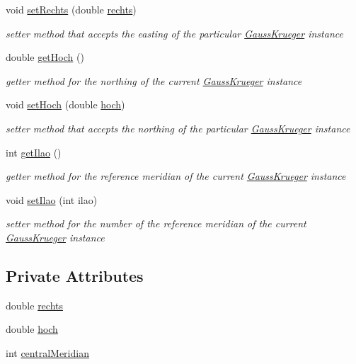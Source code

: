 \begin{DoxyCompactItemize}
void \hyperlink{classcoordinates_1_1_gauss_krueger_aae6034f16ac245dac1c1d84722048894}{set\+Rechts} (double \hyperlink{classcoordinates_1_1_gauss_krueger_a7b3a7878b5c0e9af6afee712997630b7}{rechts})
\begin{DoxyCompactList}\small\item\em setter method that accepts the easting of the particular \hyperlink{classcoordinates_1_1_gauss_krueger}{Gauss\+Krueger} instance \end{DoxyCompactList}\item 
double \hyperlink{classcoordinates_1_1_gauss_krueger_ac6dfe7a78850b5aa7c69e1e5d2a0b3cf}{get\+Hoch} ()
\begin{DoxyCompactList}\small\item\em getter method for the northing of the current \hyperlink{classcoordinates_1_1_gauss_krueger}{Gauss\+Krueger} instance \end{DoxyCompactList}\item 
void \hyperlink{classcoordinates_1_1_gauss_krueger_acf100c94ccd6ce16857ec83876578aa5}{set\+Hoch} (double \hyperlink{classcoordinates_1_1_gauss_krueger_ad0effac6a487835234850d6dc8805843}{hoch})
\begin{DoxyCompactList}\small\item\em setter method that accepts the northing of the particular \hyperlink{classcoordinates_1_1_gauss_krueger}{Gauss\+Krueger} instance \end{DoxyCompactList}\item 
int \hyperlink{classcoordinates_1_1_gauss_krueger_a3052602f8c5575a22cc7a1a63c5cb063}{get\+Ilao} ()
\begin{DoxyCompactList}\small\item\em getter method for the reference meridian of the current \hyperlink{classcoordinates_1_1_gauss_krueger}{Gauss\+Krueger} instance \end{DoxyCompactList}\item 
void \hyperlink{classcoordinates_1_1_gauss_krueger_a9dc35489df5fd3430d61f0d47ca27b82}{set\+Ilao} (int ilao)
\begin{DoxyCompactList}\small\item\em setter method for the number of the reference meridian of the current \hyperlink{classcoordinates_1_1_gauss_krueger}{Gauss\+Krueger} instance \end{DoxyCompactList}\end{DoxyCompactItemize}
\subsection*{Private Attributes}
\begin{DoxyCompactItemize}
\item 
double \hyperlink{classcoordinates_1_1_gauss_krueger_a7b3a7878b5c0e9af6afee712997630b7}{rechts}
\item 
double \hyperlink{classcoordinates_1_1_gauss_krueger_ad0effac6a487835234850d6dc8805843}{hoch}
\item 
int \hyperlink{classcoordinates_1_1_gauss_krueger_a8118e7f54b47ed00d9ba473f381392c0}{central\+Meridian}
\end{DoxyCompactItemize}
